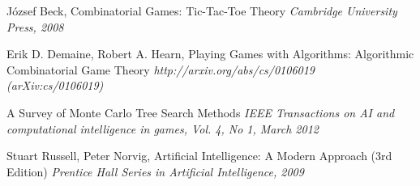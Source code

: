 \begin{thebibliography}{9}


József Beck, Combinatorial Games: Tic-Tac-Toe Theory
\emph{Cambridge University Press, 2008}

Erik D. Demaine, Robert A. Hearn, Playing Games with Algorithms: Algorithmic Combinatorial Game Theory
\emph{http://arxiv.org/abs/cs/0106019 (arXiv:cs/0106019)}

A Survey of Monte Carlo Tree Search Methods
\emph{IEEE Transactions on AI and computational intelligence in games, Vol. 4, No 1, March 2012}


Stuart Russell, Peter Norvig, Artificial Intelligence: A Modern Approach (3rd Edition) 
\emph{Prentice Hall Series in Artificial Intelligence, 2009}


\end{thebibliography}
